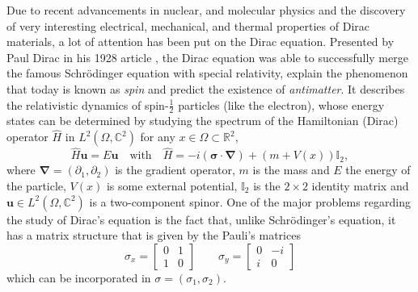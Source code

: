 Due to recent advancements in nuclear, and molecular physics and the discovery of very interesting electrical, mechanical, and thermal properties of Dirac materials, a lot of attention has been put on the Dirac equation. Presented by Paul Dirac in his 1928 article \cite{dirac1928quantum}, the Dirac equation was able to successfully merge the famous Schr\"{o}dinger equation with special relativity, explain the phenomenon that today is known as \textit{spin} and predict the existence of \textit{antimatter}.
It describes the relativistic dynamics of spin-$\frac{1}{2}$ particles (like the electron), whose energy states can be determined by studying the spectrum of the Hamiltonian (Dirac) operator \(\hat{H}\) in \(L^2(\Omega, \mathbb{C}^2)\) for any \(x \in \Omega \subset \mathbb{R}^2\),
\begin{equation}\label{dirac_eq}
    \hat{H} \mathbf{u} = E \mathbf{u} \quad \text{with} \quad \hat{H}= -i (\mathbf{\sigma} \cdot \mathbf{\nabla}) + \left(m + V(x)\right) \mathbb{I}_2,
\end{equation}
where \(\mathbf{\nabla} = (\partial_1, \partial_2) \) is the gradient operator, \(m\) is the mass and \(E\) the energy of the particle, \(V(x)\) is some external potential, \(\mathbb{I}_2\) is the \(2\times 2\) identity matrix and \(\mathbf{u} \in L^2(\Omega, \mathbb{C}^2)\) is a two-component spinor. One of the major problems regarding the study of Dirac's equation is the fact that, unlike Schr\"{o}dinger's equation, it has a matrix structure that is given by the Pauli's matrices
\[
\sigma_x = \begin{bmatrix}
    0 & 1\\
    1 & 0
\end{bmatrix} \qquad \sigma_y = \begin{bmatrix}
    0 & -i\\
    i & 0
\end{bmatrix}
\]
which can be incorporated in \(\sigma = (\sigma_1, \sigma_2)\).    

